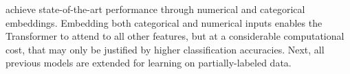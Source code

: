 \textcite[][18939]{gorishniyRevisitingDeepLearning2021} achieve state-of-the-art performance through numerical and categorical embeddings. Embedding both categorical and numerical inputs enables the Transformer to attend to all other features, but at a considerable computational cost, that may only be justified by higher classification accuracies. Next, all previous models are extended for learning on partially-labeled data.